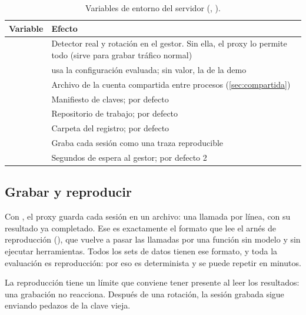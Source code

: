 \begin{table}[ht]
\caption{Variables de entorno del servidor (, ).}\label{tab:entorno}
\small
\begin{tabularx}{\textwidth}{@{}P{3.6cm}L@{}}
\toprule
Variable & Efecto \\
\midrule
{} & Detector real y rotación en el gestor. Sin ella, el proxy lo permite todo
  (sirve para grabar tráfico normal) \\
 &  usa la configuración evaluada; sin valor, la de la demo \\
 & Archivo de la cuenta compartida entre procesos (\cref{sec:compartida}) \\
 & Manifiesto de claves; por defecto  \\
 & Repositorio de trabajo; por defecto  \\
 & Carpeta del registro; por defecto  \\
 & Graba cada sesión como una traza reproducible \\
 & Segundos de espera al gestor; por defecto 2 \\
\bottomrule
\end{tabularx}
\end{table}

\subsection{Grabar y reproducir}\label{sec:reproducir}

Con , el proxy guarda cada sesión en un archivo: una llamada por línea, con su
resultado ya completado. Ese es exactamente el formato que lee el arnés de reproducción
(), que vuelve a pasar las llamadas por una función  sin modelo y
sin ejecutar herramientas. Todos los sets de datos tienen ese formato, y toda la evaluación es
reproducción: por eso es determinista y se puede repetir en minutos.

La reproducción tiene un límite que conviene tener presente al leer los resultados: una grabación no
reacciona. Después de una rotación, la sesión grabada sigue enviando pedazos de la clave vieja.
